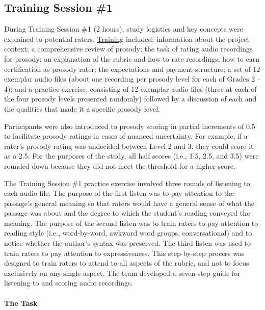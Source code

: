 \documentclass[
]{article}
\begin{document}
\hypertarget{training-session-1}{%
\subsection{Training Session \#1}\label{training-session-1}}

During Training Session \#1 (2 hours), study logistics and key concepts
were explained to potential raters.
\href{https://jnese.github.io/CORE-II_trainingwebsite/CORE_training_session1day2_FINAL.pdf}{Training}
included: information about the project context; a comprehensive review
of prosody; the task of rating audio recordings for prosody; an
explanation of the rubric and how to rate recordings; how to earn
certification as prosody rater; the expectations and payment structure;
a set of 12 exemplar audio files (about one recording per prosody level
for each of Grades 2 -- 4); and a practice exercise, consisting of 12
exemplar audio files (three at each of the four prosody levels presented
randomly) followed by a discussion of each and the qualities that made
it a specific prosody level.

Participants were also introduced to prosody scoring in partial
increments of 0.5 to facilitate prosody ratings in cases of nuanced
uncertainty. For example, if a rater's prosody rating was undecided
between Level 2 and 3, they could score it as a 2.5. For the purposes of
the study, all half scores (i.e., 1.5, 2.5, and 3.5) were rounded down
because they did not meet the threshold for a higher score.

The Training Session \#1 practice exercise involved three rounds of
listening to each audio file. The purpose of the first listen was to pay
attention to the passage's general meaning so that raters would have a
general sense of what the passage was about and the degree to which the
student's reading conveyed the meaning. The purpose of the second listen
was to train raters to pay attention to reading style (i.e.,
word-by-word, awkward word groups, conversational) and to notice whether
the author's syntax was preserved. The third listen was used to train
raters to pay attention to expressiveness. This step-by-step process was
designed to train raters to attend to all aspects of the rubric, and not
to focus exclusively on any single aspect. The team developed a
seven-step guide for listening to and scoring audio recordings.

\hypertarget{the-task}{%
\paragraph{The Task}\label{the-task}}
\end{document}
